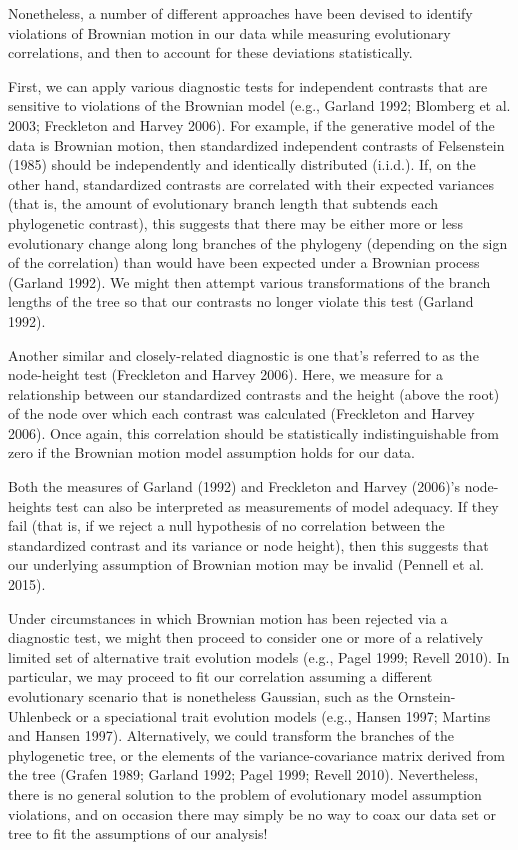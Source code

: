 \documentclass[fleqn,10pt,lineno]{wlpeerj} %
\begin{document}
Nonetheless, a number of different approaches have been devised to identify violations of Brownian motion in our data while measuring evolutionary correlations, and then to account for these deviations statistically.

First, we can apply various diagnostic tests for independent contrasts that are sensitive to violations of the Brownian model (e.g., Garland 1992; Blomberg et al. 2003; Freckleton and Harvey 2006). For example, if the generative model of the data is Brownian motion, then standardized independent contrasts of Felsenstein (1985) should be independently and identically distributed (i.i.d.). If, on the other hand, standardized contrasts are correlated with their expected variances (that is, the amount of evolutionary branch length that subtends each phylogenetic contrast), this suggests that there may be either more or less evolutionary change along long branches of the phylogeny (depending on the sign of the correlation) than would have been expected under a Brownian process (Garland 1992). We might then attempt various transformations of the branch lengths of the tree so that our contrasts no longer violate this test (Garland 1992).

Another similar and closely-related diagnostic is one that's referred to as the node-height test (Freckleton and Harvey 2006). Here, we measure for a relationship between our standardized contrasts and the height (above the root) of the node over which each contrast was calculated (Freckleton and Harvey 2006). Once again, this correlation should be statistically indistinguishable from zero if the Brownian motion model assumption holds for our data.

Both the measures of Garland (1992) and Freckleton and Harvey (2006)'s node-heights test can also be interpreted as measurements of model adequacy. If they fail (that is, if we reject a null hypothesis of no correlation between the standardized contrast and its variance or node height), then this suggests that our underlying assumption of Brownian motion may be invalid (Pennell et al. 2015).

Under circumstances in which Brownian motion has been rejected via a diagnostic test, we might then proceed to consider one or more of a relatively limited set of alternative trait evolution models (e.g., Pagel 1999; Revell 2010). In particular, we may proceed to fit our correlation assuming a different evolutionary scenario that is nonetheless Gaussian, such as the Ornstein-Uhlenbeck or a speciational trait evolution models (e.g., Hansen 1997; Martins and Hansen 1997). Alternatively, we could transform the branches of the phylogenetic tree, or the elements of the variance-covariance matrix derived from the tree (Grafen 1989; Garland 1992; Pagel 1999; Revell 2010). Nevertheless, there is no general solution to the problem of evolutionary model assumption violations, and on occasion there may simply be no way to coax our data set or tree to fit the assumptions of our analysis!
\end{document}
